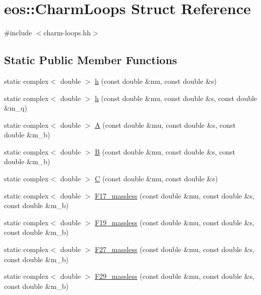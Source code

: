 \hypertarget{structeos_1_1CharmLoops}{
\section{eos::CharmLoops Struct Reference}
\label{structeos_1_1CharmLoops}
}


{\ttfamily \#include $<$charm-\/loops.hh$>$}\subsection*{Static Public Member Functions}
\begin{DoxyCompactItemize}
\item 
static complex$<$ double $>$ \hyperlink{structeos_1_1CharmLoops_a2b0657d433f9e17904202a5309d3a4a2}{h} (const double \&mu, const double \&s)
\item 
static complex$<$ double $>$ \hyperlink{structeos_1_1CharmLoops_a8255879e6ac2840a7bfc652aceac5221}{h} (const double \&mu, const double \&s, const double \&m\_\-q)
\item 
static complex$<$ double $>$ \hyperlink{structeos_1_1CharmLoops_ab2fd582d0ba9c5b1181ff2e63c4f5f88}{A} (const double \&mu, const double \&s, const double \&m\_\-b)
\item 
static complex$<$ double $>$ \hyperlink{structeos_1_1CharmLoops_ad1599db67462adc30f33918fe774bfe3}{B} (const double \&mu, const double \&s, const double \&m\_\-b)
\item 
static complex$<$ double $>$ \hyperlink{structeos_1_1CharmLoops_a41ed4114fe8c4a25702232a9421b8e05}{C} (const double \&mu, const double \&s)
\item 
static complex$<$ double $>$ \hyperlink{structeos_1_1CharmLoops_a0e49ca63c218a3bc80575df602508454}{F17\_\-massless} (const double \&mu, const double \&s, const double \&m\_\-b)
\item 
static complex$<$ double $>$ \hyperlink{structeos_1_1CharmLoops_afbab032d85a4b70b3ea223acf50e8e38}{F19\_\-massless} (const double \&mu, const double \&s, const double \&m\_\-b)
\item 
static complex$<$ double $>$ \hyperlink{structeos_1_1CharmLoops_a9fd74444d72504308c806d91943b2933}{F27\_\-massless} (const double \&mu, const double \&s, const double \&m\_\-b)
\item 
static complex$<$ double $>$ \hyperlink{structeos_1_1CharmLoops_a127312f7cefb95c9e4d19fe90aaadb9a}{F29\_\-massless} (const double \&mu, const double \&s, const double \&m\_\-b)
\item 

\end{DoxyCompactItemize}
